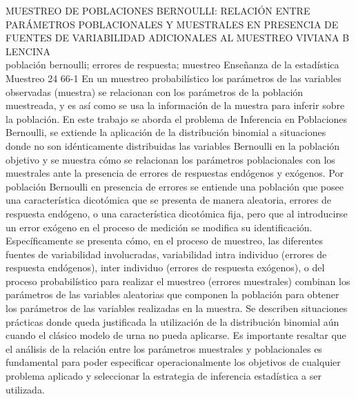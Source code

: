 \A
{MUESTREO DE POBLACIONES BERNOULLI: RELACIÓN ENTRE PARÁMETROS POBLACIONALES Y MUESTRALES EN PRESENCIA DE FUENTES DE VARIABILIDAD ADICIONALES AL MUESTREO}
{VIVIANA B LENCINA}
{
\\
}
{población bernoulli; errores de respuesta; muestreo} 
 {Enseñanza de la estadística} 
 {Muestreo} 
 {24} 
 {66-1}
{En un muestreo probabilístico los parámetros de las variables observadas (muestra) se relacionan con los parámetros de la población muestreada, y es así como se usa la información de la muestra para inferir sobre la población. En este trabajo se aborda el problema de Inferencia en Poblaciones Bernoulli, se extiende la aplicación de la distribución binomial a situaciones donde no son idénticamente distribuidas las variables Bernoulli en la población objetivo y se muestra cómo se relacionan los parámetros poblacionales con los muestrales ante la presencia de errores de respuestas endógenos y exógenos. Por población Bernoulli en presencia de errores se entiende una población que posee una característica dicotómica que se presenta de manera aleatoria, errores de respuesta endógeno, o una característica dicotómica fija, pero que al introducirse un error exógeno en el proceso de medición se modifica su identificación. Específicamente se presenta cómo, en el proceso de muestreo, las diferentes fuentes de variabilidad involucradas, variabilidad intra individuo (errores de respuesta endógenos), inter individuo (errores de respuesta exógenos), o del proceso probabilístico para realizar el muestreo (errores muestrales) combinan los parámetros de las variables aleatorias que componen la población para obtener los parámetros de las variables realizadas en la muestra. Se describen situaciones prácticas donde queda justificada la utilización de la distribución binomial aún cuando el clásico modelo de urna no pueda aplicarse. Es importante resaltar que el análisis de la relación entre los parámetros muestrales y poblacionales es fundamental para poder especificar operacionalmente los objetivos de cualquier problema aplicado y seleccionar la estrategia de inferencia estadística a ser utilizada.}
